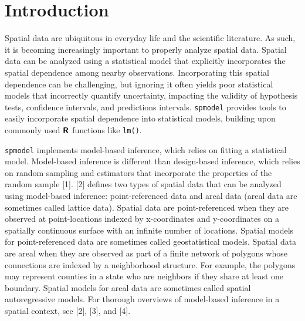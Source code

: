 \documentclass[10pt,letterpaper]{article}
\begin{document}
\linenumbers

\hypertarget{sec:introduction}{%
\section{Introduction}\label{sec:introduction}}

Spatial data are ubiquitous in everyday life and the scientific
literature. As such, it is becoming increasingly important to properly
analyze spatial data. Spatial data can be analyzed using a statistical
model that explicitly incorporates the spatial dependence among nearby
observations. Incorporating this spatial dependence can be challenging,
but ignoring it often yields poor statistical models that incorrectly
quantify uncertainty, impacting the validity of hypothesis tests,
confidence intervals, and predictions intervals. \texttt{spmodel}
provides tools to easily incorporate spatial dependence into statistical
models, building upon commonly used \(\textbf{\textsf{R}}\) functions
like \texttt{lm()}.

\texttt{spmodel} implements model-based inference, which relies on
fitting a statistical model. Model-based inference is different than
design-based inference, which relies on random sampling and estimators
that incorporate the properties of the random sample {[}1{]}. {[}2{]}
defines two types of spatial data that can be analyzed using model-based
inference: point-referenced data and areal data (areal data are
sometimes called lattice data). Spatial data are point-referenced when
they are observed at point-locations indexed by x-coordinates and
y-coordinates on a spatially continuous surface with an infinite number
of locations. Spatial models for point-referenced data are sometimes
called geostatistical models. Spatial data are areal when they are
observed as part of a finite network of polygons whose connections are
indexed by a neighborhood structure. For example, the polygons may
represent counties in a state who are neighbors if they share at least
one boundary. Spatial models for areal data are sometimes called spatial
autoregressive models. For thorough overviews of model-based inference
in a spatial context, see {[}2{]}, {[}3{]}, and {[}4{]}.
\end{document}
